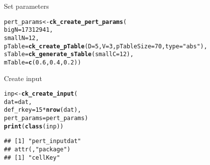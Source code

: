 \documentclass{beamer}\usepackage[]{graphicx}\usepackage[]{color}
\makeatletter
\newcommand{\hlnum}[1]{\textcolor[rgb]{0.686,0.059,0.569}{#1}}%
\newcommand{\hlstr}[1]{\textcolor[rgb]{0.192,0.494,0.8}{#1}}%
\newcommand{\hlopt}[1]{\textcolor[rgb]{0,0,0}{#1}}%
\newcommand{\hlstd}[1]{\textcolor[rgb]{0.345,0.345,0.345}{#1}}%
\newcommand{\hlkwb}[1]{\textcolor[rgb]{0.69,0.353,0.396}{#1}}%
\newcommand{\hlkwc}[1]{\textcolor[rgb]{0.333,0.667,0.333}{#1}}%
\newcommand{\hlkwd}[1]{\textcolor[rgb]{0.737,0.353,0.396}{\textbf{#1}}}%
\newenvironment{kframe}{%
 \def\at@end@of@kframe{}%
 \ifinner\ifhmode%
  \def\at@end@of@kframe{\end{minipage}}%
  \begin{minipage}{\columnwidth}%
 \fi\fi%
 \def\FrameCommand##1{\hskip\@totalleftmargin \hskip-\fboxsep
 \colorbox{shadecolor}{##1}\hskip-\fboxsep
     \hskip-\linewidth \hskip-\@totalleftmargin \hskip\columnwidth}%
 \MakeFramed {\advance\hsize-\width
   \@totalleftmargin\z@ \linewidth\hsize
   \@setminipage}}%
 {\par\unskip\endMakeFramed%
 \at@end@of@kframe}
\newenvironment{knitrout}{}{} %
\makeatother
\begin{document}
\begin{frame}[fragile]{Set parameters}

\begin{knitrout}\footnotesize
{}\color{fgcolor}\begin{kframe}
\begin{alltt}
\hlstd{pert_params} \hlkwb{<-} \hlkwd{ck_create_pert_params}\hlstd{(}
  \hlkwc{bigN}\hlstd{=}\hlnum{17312941}\hlstd{,}
  \hlkwc{smallN}\hlstd{=}\hlnum{12}\hlstd{,}
  \hlkwc{pTable}\hlstd{=}\hlkwd{ck_create_pTable}\hlstd{(}\hlkwc{D}\hlstd{=}\hlnum{5}\hlstd{,} \hlkwc{V}\hlstd{=}\hlnum{3}\hlstd{,} \hlkwc{pTableSize}\hlstd{=}\hlnum{70}\hlstd{,} \hlkwc{type}\hlstd{=}\hlstr{"abs"}\hlstd{),}
  \hlkwc{sTable}\hlstd{=}\hlkwd{ck_generate_sTable}\hlstd{(}\hlkwc{smallC}\hlstd{=}\hlnum{12}\hlstd{),}
  \hlkwc{mTable}\hlstd{=}\hlkwd{c}\hlstd{(}\hlnum{0.6}\hlstd{,}\hlnum{0.4}\hlstd{,}\hlnum{0.2}\hlstd{))}
\end{alltt}
\end{kframe}
\end{knitrout}
\end{frame}

\begin{frame}[fragile]{Create input}

\begin{knitrout}\footnotesize
{}\color{fgcolor}\begin{kframe}
\begin{alltt}
\hlstd{inp} \hlkwb{<-} \hlkwd{ck_create_input}\hlstd{(}
  \hlkwc{dat}\hlstd{=dat,}
  \hlkwc{def_rkey}\hlstd{=}\hlnum{15}\hlopt{*}\hlkwd{nrow}\hlstd{(dat),}
  \hlkwc{pert_params}\hlstd{=pert_params)}
\hlkwd{print}\hlstd{(}\hlkwd{class}\hlstd{(inp))}
\end{alltt}
\begin{verbatim}
## [1] "pert_inputdat"
## attr(,"package")
## [1] "cellKey"
\end{verbatim}
\end{kframe}
\end{knitrout}
\end{frame}
\end{document}
